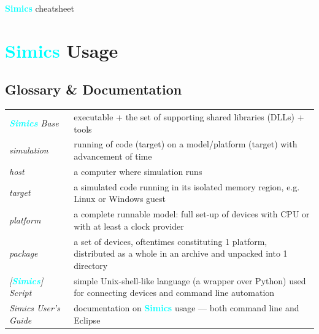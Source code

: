 \documentclass[8pt]{extarticle}
\newcommand{\cod}[2][green!10]{\tcbox[
    size=fbox,
    on line,
    colback=#1,
    colframe=black,
    arc=0.3em  %
]{#2}}
\newcommand{\Simics}{\textcolor{cyan}{\textbf{Simics}}}
\newlength{\MyLen}
\begin{document}
\setlength\emergencystretch{\hsize}


\begin{multicols*}{3}
    {\Large\centering \Simics{} cheatsheet\par}

\section{\Simics{} Usage}

\subsection{Glossary \& Documentation}
    \begin{tabular}{p{\the\MyLen}p{\linewidth-\the\MyLen-0.8cm}}
        \textit{\Simics{} Base} & \cod{simics} executable + the set of
        supporting shared libraries (DLLs) + tools
        \\
        \textit{simulation}  & running of code (target) on
        a model/platform (target) with advancement of time
        \\
        \textit{host}        & a computer where simulation runs
        \\
        \textit{target}      & a simulated
        code running in its isolated memory region, e.g. Linux or
        Windows guest
        \\
        \textit{platform}  & a complete runnable model:
        full set-up of devices
        with CPU or with at least a clock provider
        \\
        \textit{package}   & a set of devices, oftentimes constituting
        1 platform, distributed as a whole in an archive and unpacked
        into 1 directory
        \\
        \textit{[\Simics] Script} & simple Unix-shell-like language (a wrapper
        over Python) used for connecting devices and command line 
        automation
        \\
        \textit{Simics User’s Guide} & documentation on \Simics{}
        usage — both command line and Eclipse
    \end{tabular}


\end{multicols*}
\end{document}

